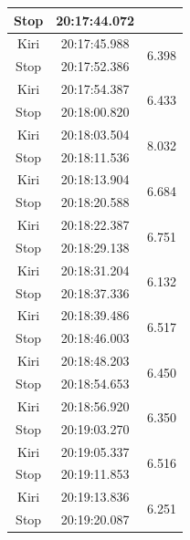 \begin{longtable}{|c|c|c|}
  Stop           & 20:17:44.072        &                         \\ \hline
  Kiri           & 20:17:45.988        & \multirow{2}{*}{6.398}  \\ \cline{1-2}
  Stop           & 20:17:52.386        &                         \\ \hline
  Kiri           & 20:17:54.387        & \multirow{2}{*}{6.433}  \\ \cline{1-2}
  Stop           & 20:18:00.820        &                         \\ \hline
  Kiri           & 20:18:03.504        & \multirow{2}{*}{8.032}  \\ \cline{1-2}
  Stop           & 20:18:11.536        &                         \\ \hline
  Kiri           & 20:18:13.904        & \multirow{2}{*}{6.684}  \\ \cline{1-2}
  Stop           & 20:18:20.588        &                         \\ \hline
  Kiri           & 20:18:22.387        & \multirow{2}{*}{6.751}  \\ \cline{1-2}
  Stop           & 20:18:29.138        &                         \\ \hline
  Kiri           & 20:18:31.204        & \multirow{2}{*}{6.132}  \\ \cline{1-2}
  Stop           & 20:18:37.336        &                         \\ \hline
  Kiri           & 20:18:39.486        & \multirow{2}{*}{6.517}  \\ \cline{1-2}
  Stop           & 20:18:46.003        &                         \\ \hline
  Kiri           & 20:18:48.203        & \multirow{2}{*}{6.450}  \\ \cline{1-2}
  Stop           & 20:18:54.653        &                         \\ \hline
  Kiri           & 20:18:56.920        & \multirow{2}{*}{6.350}  \\ \cline{1-2}
  Stop           & 20:19:03.270        &                         \\ \hline
  Kiri           & 20:19:05.337        & \multirow{2}{*}{6.516}  \\ \cline{1-2}
  Stop           & 20:19:11.853        &                         \\ \hline
  Kiri           & 20:19:13.836        & \multirow{2}{*}{6.251}  \\ \cline{1-2}
  Stop           & 20:19:20.087        &                         \\ \hline

\end{longtable}

